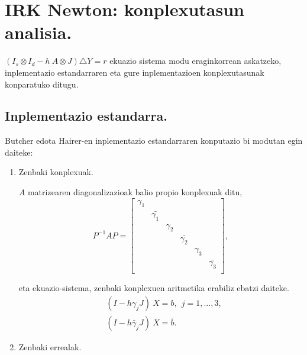  
\section{IRK Newton: konplexutasun analisia.}

$(I_s \otimes I_d - h \ A \otimes J) \triangle Y = r$ ekuazio sistema modu eraginkorrean askatzeko, inplementazio estandarraren eta gure inplementazioen konplexutasunak konparatuko ditugu.

\subsection*{Inplementazio estandarra.}

Butcher edota Hairer-en inplementazio estandarraren konputazio bi modutan egin daiteke:

\begin{enumerate}
\item Zenbaki konplexuak.

$A$ matrizearen diagonalizazioak balio propio konplexuak ditu, 
\begin{equation*}
P^{-1}AP=\begin{bmatrix}
  \gamma_1 &                &          &                &           &                 \\
           & \bar{\gamma_1} &          &                &           &                 \\
           &                & \gamma_2 &                &           &                 \\
           &                &          & \bar{\gamma_2} &           &                 \\ 
           &                &          &                & \gamma_3   &                 \\
           &                &          &                &            & \bar{\gamma_3} \\  
\end{bmatrix},
\end{equation*}

eta ekuazio-sistema, zenbaki konplexuen aritmetika erabiliz ebatzi daiteke.
\begin{align*}
&(I-h \gamma_j J) \ X = b, \ \ j=1,\dots,3, \\
&(I-h \bar{\gamma}_j J) \ X = \bar{b}. 
\end{align*}

\item Zenbaki errealak.


\end{enumerate}

